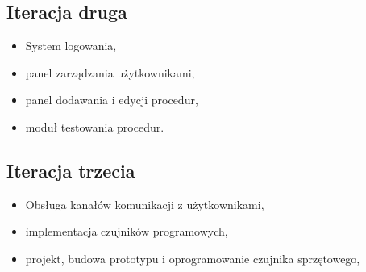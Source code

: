 \documentclass[a4paper,12pt]{article}
\begin{document}
\subsection{Iteracja druga}

\begin{itemize}
	\item System logowania,
	\item panel zarządzania użytkownikami,
	\item panel dodawania i edycji procedur,
	\item moduł testowania procedur.
\end{itemize}


\subsection{Iteracja trzecia}

\begin{itemize}
	\item Obsługa kanałów komunikacji z użytkownikami,
	\item implementacja czujników programowych,
	\item projekt, budowa prototypu i oprogramowanie czujnika sprzętowego,
\end{itemize}

\end{document}
